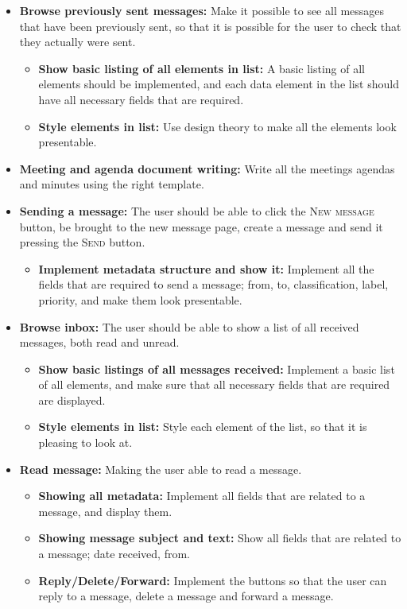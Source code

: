 \begin{itemize}
\item{}\textbf{Browse previously sent messages:} Make it possible to see all messages that have been previously sent, so that it is possible for the user to check that they actually were sent.
\begin{itemize}
\item{}\textbf{Show basic listing of all elements in list:} A basic listing of all elements should be implemented, and each data element in the list should have all necessary fields that are required.
\item{}\textbf{Style elements in list:} Use design theory to make all the elements look presentable.
\end{itemize}
\item{}\textbf{Meeting and agenda document writing:} Write all the meetings agendas and minutes using the right template.
\item{}\textbf{Sending a message:} The user should be able to click the \textsc{New message} button, be brought to the new message page, create a message and send it pressing the \textsc{Send} button.
\begin{itemize}
\item{}\textbf{Implement metadata structure and show it:} Implement all the fields that are required to send a message; from, to, classification, label, priority, and make them look presentable.
\end{itemize}
\item{}\textbf{Browse inbox:} The user should be able to show a list of all received messages, both read and unread.
\begin{itemize}
\item{}\textbf{Show basic listings of all messages received:} Implement a basic list of all elements, and make sure that all necessary fields that are required are displayed.
\item{}\textbf{Style elements in list:} Style each element of the list, so that it is pleasing to look at.
\end{itemize}
\item{}\textbf{Read message:} Making the user able to read a message.
\begin{itemize}
\item{}\textbf{Showing all metadata:} Implement all fields that are related to a message, and display them.
\item{}\textbf{Showing message subject and text:} Show all fields that are related to a message; date received, from.
\item{}\textbf{Reply/Delete/Forward:} Implement the buttons so that the user can reply to a message, delete a message and forward a message.

\end{itemize}
\end{itemize}

